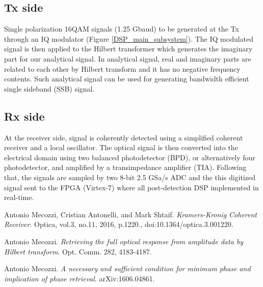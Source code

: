 \subsection{Tx side}
Single polarization 16QAM signals (1.25 Gbaud) to be generated at the Tx through an IQ modulator (Figure \ref{DSP_main_subsystem}). The IQ modulated signal is then applied to the Hilbert transformer which generates the imaginary part for our analytical signal. In analytical signal, real and imaginary parts are related to each other by Hilbert transform and it has no negative frequency contents. Such analytical signal can be used for generating bandwidth efficient single sideband (SSB) signal.

\subsection{Rx side}
At the receiver side, signal is coherently detected using a simplified coherent receiver and a local oscillator. The optical signal is then converted into the electrical domain using two balanced photodetector (BPD), or alternatively four photodetector, and amplified by a transimpedance amplifier (TIA). Following that, the signals are sampled by two 8-bit 2.5 GSa/s ADC and the this digitized signal sent to the FPGA (Virtex-7) where all post-detection DSP implemented in real-time.

\begin{thebibliography}{9}
	Antonio Mecozzi, Cristian Antonelli, and Mark Shtaif.
	\textit{Kramers-Kronig Coherent Receiver}.
	Optica, vol.3, no.11, 2016, p.1220., doi:10.1364/optica.3.001220.
	
	Antonio Mecozzi.
	\textit{Retrieving the full optical response from amplitude data by Hilbert transform}. Opt. Comm. 282, 4183-4187.
	
	Antonio Mecozzi.
	\textit{A necessary and sufficient condition for minimum phase and implication of phase retrieval}. arXiv:1606.04861.
\end{thebibliography}










